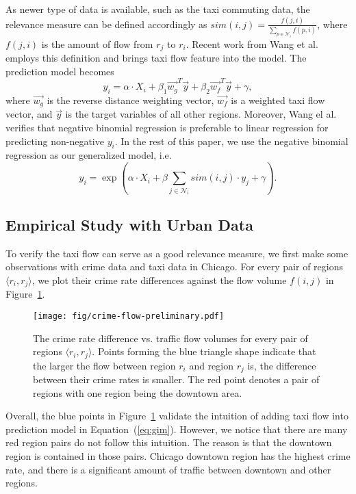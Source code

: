 As newer type of data is available, such as the taxi commuting data, the relevance measure can be defined accordingly as $sim(i,j) = \frac{f(j,i)}{\sum_{p \in \mathcal{N}_i} f(p,i)}$, where $f(j,i)$ is the amount of flow from $r_j$ to $r_i$.
Recent work from Wang et al.~\cite{wang2016crime} employs this definition and brings taxi flow feature into the model. The prediction model becomes 
\begin{equation}
\label{eq:gim}
y_i = \alpha \cdot X_i + \beta_1 \vec{w_g}^T \vec{y} + \beta_2 \vec{w_f}^T \vec{y} + \gamma,
\end{equation}
where $\vec{w_g}$ is the reverse distance weighting vector, $\vec{w_f}$ is a weighted taxi flow vector, and $\vec{y}$ is the target variables of all other regions. Moreover, Wang el al.~\cite{wang2016crime} verifies that negative binomial regression is preferable to linear regression for predicting non-negative $y_i$. In the rest of this paper, we use the negative binomial regression as our generalized model, i.e.  
\begin{equation}
\label{eq:nbr}
y_i = \exp (\alpha \cdot X_i + \beta \sum_{j \in \mathcal{N}_i} sim(i,j) \cdot y_j + \gamma).
\end{equation}


\subsection{Empirical Study with Urban Data}

To verify the taxi flow can serve as a good relevance measure, we first make some observations with crime data and taxi data in Chicago. For every pair of regions $\langle r_i, r_j \rangle$, we plot their crime rate differences against the flow volume $f(i,j)$ in Figure~\ref{fig:prelm}.

\begin{figure}[h]
\centering
\texttt{[image: fig/crime-flow-preliminary.pdf]}
\vspace{-3mm}
\caption{The crime rate difference vs. traffic flow volumes for every pair of regions $\langle r_i, r_j \rangle$. Points forming the blue triangle shape indicate that the larger the flow between region $r_i$ and region $r_j$ is, the difference between their crime rates is smaller. The red point denotes a pair of regions with one region being the downtown area.}
\label{fig:prelm}
\end{figure}

Overall, the blue points in Figure~\ref{fig:prelm} validate the intuition of adding taxi flow into prediction model in Equation~(\ref{eq:gim}). However, we notice that there are  many red region pairs do not follow this intuition. The reason is that the downtown region is contained in those pairs. Chicago downtown region has the highest crime rate, and there is a significant amount of traffic between downtown and other regions.

